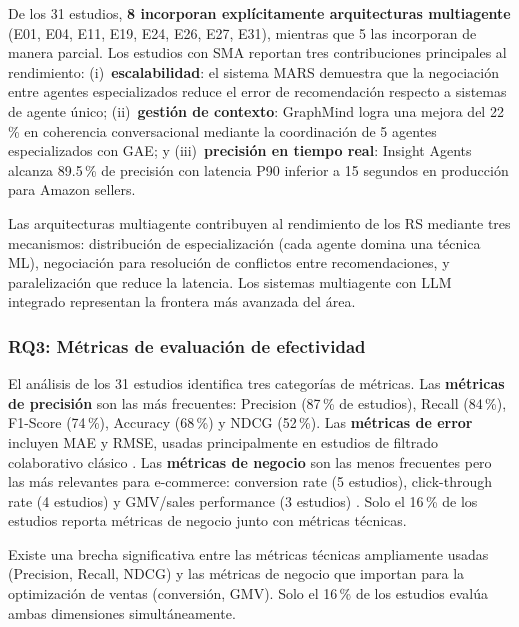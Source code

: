 \documentclass[12pt, a4paper]{article}
\begin{document}
De los 31 estudios, \textbf{8 incorporan expl\'icitamente arquitecturas
multiagente} (E01, E04, E11, E19, E24, E26, E27, E31), mientras que 5 las
incorporan de manera parcial. Los estudios con SMA reportan tres contribuciones
principales al rendimiento: (i)~\textbf{escalabilidad}: el sistema MARS
\cite{Alhejaili2021} demuestra que la negociaci\'on entre agentes especializados
reduce el error de recomendaci\'on respecto a sistemas de agente \'unico;
(ii)~\textbf{gesti\'on de contexto}: GraphMind \cite{Ho2025GraphMind} logra
una mejora del 22\,\% en coherencia conversacional mediante la coordinaci\'on
de 5 agentes especializados con GAE; y (iii)~\textbf{precisi\'on en tiempo
real}: Insight Agents \cite{Bai2025} alcanza 89.5\,\% de precisi\'on con
latencia P90 inferior a 15 segundos en producci\'on para Amazon sellers.

\begin{hallazgo}[]
  Las arquitecturas multiagente contribuyen al rendimiento de los RS mediante
  tres mecanismos: distribuci\'on de especializaci\'on (cada agente domina una
  t\'ecnica ML), negociaci\'on para resoluci\'on de conflictos entre
  recomendaciones, y paralelizaci\'on que reduce la latencia. Los sistemas
  multiagente con LLM integrado representan la frontera m\'as avanzada del
  \'area.
\end{hallazgo}

\subsubsection{RQ3: M\'etricas de evaluaci\'on de efectividad}

El an\'alisis de los 31 estudios identifica tres categor\'ias de m\'etricas.
Las \textbf{m\'etricas de precisi\'on} son las m\'as frecuentes: Precision
(87\,\% de estudios), Recall (84\,\%), F1-Score (74\,\%), Accuracy (68\,\%)
y NDCG (52\,\%). Las \textbf{m\'etricas de error} incluyen MAE y RMSE, usadas
principalmente en estudios de filtrado colaborativo cl\'asico \cite{Alam2025,
Girish2025}. Las \textbf{m\'etricas de negocio} son las menos frecuentes pero
las m\'as relevantes para e-commerce: conversion rate (5 estudios), click-through
rate (4 estudios) y GMV/sales performance (3 estudios) \cite{Ding2025,
LiYuetong2025, Bai2025}. Solo el 16\,\% de los estudios reporta m\'etricas
de negocio junto con m\'etricas t\'ecnicas.

\begin{hallazgo}[]
  Existe una brecha significativa entre las m\'etricas t\'ecnicas ampliamente
  usadas (Precision, Recall, NDCG) y las m\'etricas de negocio que importan
  para la optimizaci\'on de ventas (conversi\'on, GMV). Solo el 16\,\% de los
  estudios eval\'ua ambas dimensiones simult\'aneamente.
\end{hallazgo}
\end{document}
